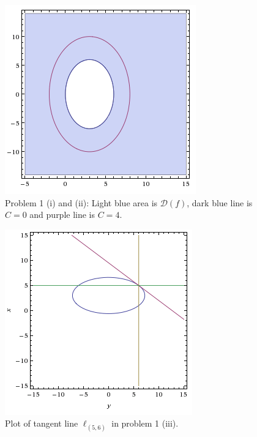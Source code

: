 \documentclass[a4paper,norsk,12pt]{article}
\begin{document}
\begin{figure}[h]
  \centering
  \includegraphics{ob1plot2.png}
  \caption{Problem 1 (i) and (ii): Light blue area is $\mathcal{D}(f)$,
           dark blue line is $C=0$ and purple line is $C=4$.}
  \label{plot.p2}
  \label{plot.p1}
\end{figure}

\begin{figure}[h]
  \centering
  \includegraphics{ob1plot3.png}
  \caption{Plot of tangent line $\ell_{(5,6)}$ in problem 1 (iii).}
  \label{plot.p3}
\end{figure}
\end{document}
